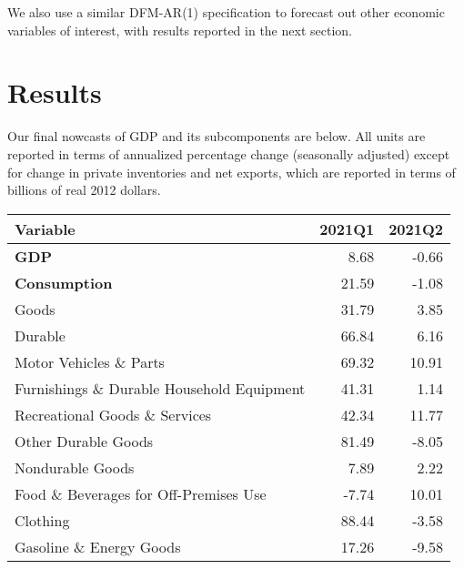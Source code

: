 \documentclass[11pt, letterpaper]{article}\usepackage[]{graphicx}\usepackage[]{color}
\begin{document}
We also use a similar DFM-AR(1) specification to forecast out other economic variables of interest, with results reported in the next section.


\section{Results}
Our final nowcasts of GDP and its subcomponents are below. All units are reported in terms of annualized percentage change (seasonally adjusted) except for change in private inventories and net exports, which are reported in terms of billions of real 2012 dollars.
\begin{table}[H]
\centering
\begingroup\fontsize{10pt}{12pt}\selectfont
\begin{tabular}{lrr}
  \hline
Variable & 2021Q1 & 2021Q2 \\ 
  \hline
\hspace{0mm} \textbf{GDP} & 8.68 & -0.66 \\ 
  \hspace{0mm} \textbf{Consumption} & 21.59 & -1.08 \\ 
  \hspace{8mm}  Goods & 31.79 & 3.85 \\ 
  \hspace{16mm}  Durable & 66.84 & 6.16 \\ 
  \hspace{24mm}  Motor Vehicles \& Parts & 69.32 & 10.91 \\ 
  \hspace{24mm}  Furnishings \& Durable Household Equipment & 41.31 & 1.14 \\ 
  \hspace{24mm}  Recreational Goods \& Services & 42.34 & 11.77 \\ 
  \hspace{24mm}  Other Durable Goods & 81.49 & -8.05 \\ 
  \hspace{16mm}  Nondurable Goods & 7.89 & 2.22 \\ 
  \hspace{24mm}  Food \& Beverages for Off-Premises Use & -7.74 & 10.01 \\ 
  \hspace{24mm}  Clothing & 88.44 & -3.58 \\ 
  \hspace{24mm}  Gasoline \& Energy Goods & 17.26 & -9.58 \\ 

\end{tabular}
\end{table}
\end{document}
